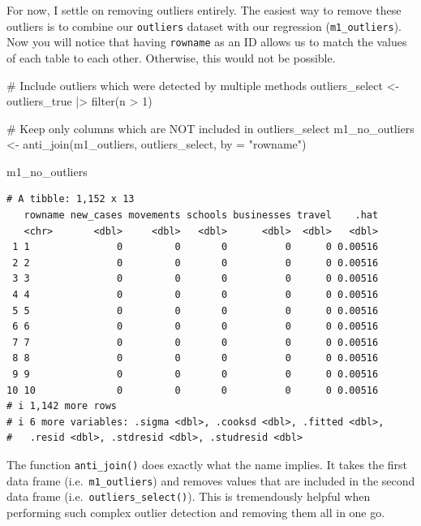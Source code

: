 \documentclass[
  letterpaper,
]{krantz}
\makeatletter
\newenvironment{Shaded}{\begin{snugshade}}{\end{snugshade}}
\newcommand{\AttributeTok}[1]{\textcolor[rgb]{0.40,0.45,0.13}{#1}}
\newcommand{\CommentTok}[1]{\textcolor[rgb]{0.37,0.37,0.37}{#1}}
\newcommand{\DecValTok}[1]{\textcolor[rgb]{0.68,0.00,0.00}{#1}}
\newcommand{\FunctionTok}[1]{\textcolor[rgb]{0.28,0.35,0.67}{#1}}
\newcommand{\NormalTok}[1]{\textcolor[rgb]{0.00,0.23,0.31}{#1}}
\newcommand{\OtherTok}[1]{\textcolor[rgb]{0.00,0.23,0.31}{#1}}
\newcommand{\SpecialCharTok}[1]{\textcolor[rgb]{0.37,0.37,0.37}{#1}}
\newcommand{\StringTok}[1]{\textcolor[rgb]{0.13,0.47,0.30}{#1}}
\newenvironment{kframe}{%
\medskip{}
\setlength{\fboxsep}{.8em}
 \def\at@end@of@kframe{}%
 \ifinner\ifhmode%
  \def\at@end@of@kframe{\end{minipage}}%
  \begin{minipage}{\columnwidth}%
 \fi\fi%
 \def\FrameCommand##1{\hskip\@totalleftmargin \hskip-\fboxsep
 \colorbox{shadecolor}{##1}\hskip-\fboxsep
     \hskip-\linewidth \hskip-\@totalleftmargin \hskip\columnwidth}%
 \MakeFramed {\advance\hsize-\width
   \@totalleftmargin\z@ \linewidth\hsize
   \@setminipage}}%
 {\par\unskip\endMakeFramed%
 \at@end@of@kframe}
\renewenvironment{Shaded}{\begin{kframe}}{\end{kframe}}
\makeatother
\begin{document}
For now, I settle on removing outliers entirely. The easiest way to
remove these outliers is to combine our \texttt{outliers} dataset with
our regression (\texttt{m1\_outliers}). Now you will notice that having
\texttt{rowname} as an ID allows us to match the values of each table to
each other. Otherwise, this would not be possible.

\begin{Shaded}
\begin{Highlighting}[]
\CommentTok{\# Include outliers which were detected by multiple methods}
\NormalTok{outliers\_select }\OtherTok{\textless{}{-}}
\NormalTok{  outliers\_true }\SpecialCharTok{|\textgreater{}}
  \FunctionTok{filter}\NormalTok{(n }\SpecialCharTok{\textgreater{}} \DecValTok{1}\NormalTok{)}

\CommentTok{\# Keep only columns which are NOT included in outliers\_select}
\NormalTok{m1\_no\_outliers }\OtherTok{\textless{}{-}} \FunctionTok{anti\_join}\NormalTok{(m1\_outliers, outliers\_select,}
                            \AttributeTok{by =} \StringTok{"rowname"}\NormalTok{)}

\NormalTok{m1\_no\_outliers}
\end{Highlighting}
\end{Shaded}

\begin{verbatim}
# A tibble: 1,152 x 13
   rowname new_cases movements schools businesses travel    .hat
   <chr>       <dbl>     <dbl>   <dbl>      <dbl>  <dbl>   <dbl>
 1 1               0         0       0          0      0 0.00516
 2 2               0         0       0          0      0 0.00516
 3 3               0         0       0          0      0 0.00516
 4 4               0         0       0          0      0 0.00516
 5 5               0         0       0          0      0 0.00516
 6 6               0         0       0          0      0 0.00516
 7 7               0         0       0          0      0 0.00516
 8 8               0         0       0          0      0 0.00516
 9 9               0         0       0          0      0 0.00516
10 10              0         0       0          0      0 0.00516
# i 1,142 more rows
# i 6 more variables: .sigma <dbl>, .cooksd <dbl>, .fitted <dbl>,
#   .resid <dbl>, .stdresid <dbl>, .studresid <dbl>
\end{verbatim}

The function \texttt{anti\_join()} does exactly what the name implies.
It takes the first data frame (i.e.~\texttt{m1\_outliers}) and removes
values that are included in the second data frame
(i.e.~\texttt{outliers\_select()}). This is tremendously helpful when
performing such complex outlier detection and removing them all in one
go.
\end{document}
